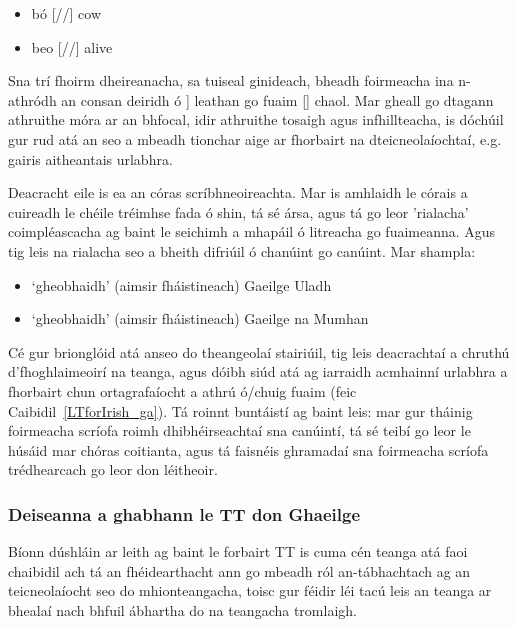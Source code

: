 \begin{multicols}{2}
\begin{itemize}
\item bó [//] cow  
\item beo [//] alive  
\end{itemize}  


Sna trí fhoirm dheireanacha, sa tuiseal ginideach, bheadh foirmeacha ina n-athródh an consan deiridh ó ] leathan go fuaim [] chaol. Mar gheall go dtagann athruithe móra ar an bhfocal, idir athruithe tosaigh agus infhillteacha, is dóchúil gur rud atá an seo a mbeadh tionchar aige ar fhorbairt na dteicneolaíochtaí, e.g. gairis aitheantais urlabhra. 





Deacracht eile is ea an córas scríbhneoireachta. Mar is amhlaidh le córais a cuireadh le chéile tréimhse fada ó shin, tá sé ársa, agus tá go leor 'rialacha’ coimpléascacha ag baint le seichimh a mhapáil ó litreacha go fuaimeanna. Agus tig leis na rialacha seo a bheith difriúil ó chanúint go canúint. Mar shampla:

\begin{itemize}
\item [ \textipa{j\textsuperscript{j}o\textlengthmark i} ] `gheobhaidh’  (aimsir fháistineach) Gaeilge Uladh
\item [ \textipa{g\textsuperscript{j}o\textlengthmark g\textsuperscript{j}} ] `gheobhaidh’  (aimsir fháistineach) Gaeilge na Mumhan
\end{itemize}

Cé gur brionglóid atá anseo do theangeolaí stairiúil, tig leis deacrachtaí a chruthú d’fhoghlaimeoirí na teanga, agus dóibh siúd atá ag iarraidh acmhainní urlabhra a fhorbairt chun ortagrafaíocht a athrú ó/chuig fuaim (feic Caibidil~\ref{LTforIrish_ga}).  Tá roinnt buntáistí ag baint leis: mar gur tháinig foirmeacha scríofa roimh dhibhéirseachtaí sna canúintí, tá sé teibí go leor le húsáid mar chóras coitianta, agus tá faisnéis ghramadaí sna foirmeacha scríofa trédhearcach go leor don léitheoir.


\subsubsection{Deiseanna a ghabhann le TT don Ghaeilge}

Bíonn dúshláin ar leith ag baint le forbairt TT is cuma cén teanga atá faoi chaibidil ach tá an fhéidearthacht ann go mbeadh ról an-tábhachtach ag an teicneolaíocht seo do mhionteangacha, toisc gur féidir léi tacú leis an teanga ar bhealaí nach bhfuil ábhartha do na teangacha tromlaigh.


\end{multicols}
